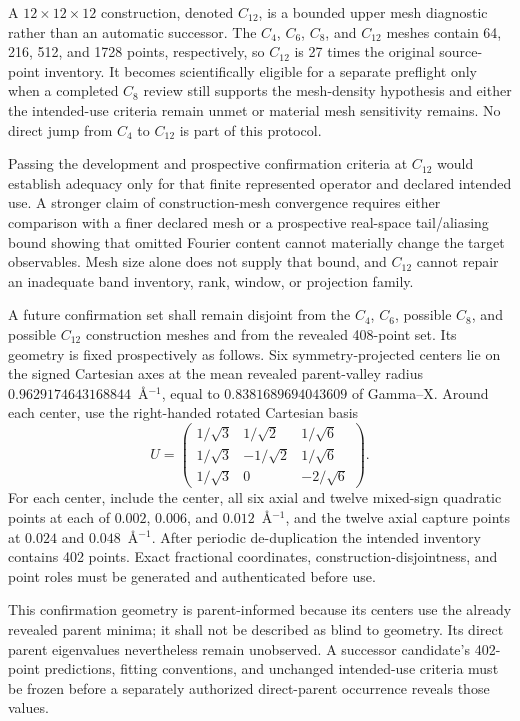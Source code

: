 \documentclass[11pt]{article}
\begin{document}
A $12\times12\times12$ construction, denoted $C_{12}$, is a bounded upper mesh
diagnostic rather than an automatic successor.  The $C_4$, $C_6$, $C_8$, and $C_{12}$
meshes contain 64, 216, 512, and 1728 points, respectively, so $C_{12}$ is 27 times the
original source-point inventory.  It becomes scientifically eligible for a separate
preflight only when a completed $C_8$ review still supports the mesh-density hypothesis
and either the intended-use criteria remain unmet or material mesh sensitivity remains.
No direct jump from $C_4$ to $C_{12}$ is part of this protocol.

Passing the development and prospective confirmation criteria at $C_{12}$ would
establish adequacy only for that finite represented operator and declared intended use.
A stronger claim of construction-mesh convergence requires either comparison with a
finer declared mesh or a prospective real-space tail/aliasing bound showing that omitted
Fourier content cannot materially change the target observables.  Mesh size alone does
not supply that bound, and $C_{12}$ cannot repair an inadequate band inventory, rank,
window, or projection family.

A future confirmation set shall remain disjoint from the $C_4$, $C_6$, possible $C_8$,
and possible $C_{12}$ construction meshes and from the revealed 408-point set.  Its geometry is fixed
prospectively as follows.  Six symmetry-projected centers lie on the signed Cartesian
axes at the mean revealed parent-valley radius
$0.9629174643168844$~\AA$^{-1}$, equal to $0.8381689694043609$ of Gamma--X.  Around each
center, use the right-handed rotated Cartesian basis
\begin{equation}
 U=\begin{pmatrix}
 1/\sqrt{3} &  1/\sqrt{2} &  1/\sqrt{6} \\
 1/\sqrt{3} & -1/\sqrt{2} &  1/\sqrt{6} \\
 1/\sqrt{3} &  0           & -2/\sqrt{6}
 \end{pmatrix}.
\end{equation}
For each center, include the center, all six axial and twelve mixed-sign quadratic
points at each of $0.002$, $0.006$, and $0.012$~\AA$^{-1}$, and the twelve axial capture
points at $0.024$ and $0.048$~\AA$^{-1}$.  After periodic de-duplication the intended
inventory contains 402 points.  Exact fractional coordinates, construction-disjointness,
and point roles must be generated and authenticated before use.

This confirmation geometry is parent-informed because its centers use the already
revealed parent minima; it shall not be described as blind to geometry.  Its direct
parent eigenvalues nevertheless remain unobserved.  A successor candidate's 402-point
predictions, fitting conventions, and unchanged intended-use criteria must be frozen
before a separately authorized direct-parent occurrence reveals those values.
\end{document}
